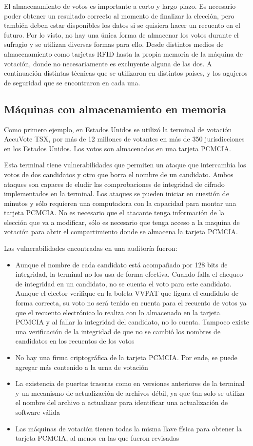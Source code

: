 El almacenamiento de votos es importante a corto y largo plazo. Es necesario poder obtener un resultado correcto al momento de finalizar la elección, pero también deben estar disponibles los datos si se quisiera hacer un recuento en el futuro.
Por lo visto, no hay una única forma de almacenar los votos durante el sufragio y se utilizan diversas formas para ello. Desde distintos medios de almacenamiento como tarjetas RFID hasta la propia memoria de la máquina de votación, donde no necesariamente es excluyente alguna de las dos.
A continuación distintas técnicas que se utilizaron en distintos países, y los agujeros de seguridad que se encontraron en cada una.

\subsection{Máquinas con almacenamiento en memoria}

Como primero ejemplo, en Estados Unidos se utilizó la terminal de votación AccuVote TSX, por más de 12 millones de votantes en más de 350 jurisdicciones en los Estados Unidos. Los votos son almacenados en una tarjeta PCMCIA\cite{davtyan}.

Esta terminal tiene vulnerabilidades que permiten un ataque que intercambia los votos de dos candidatos y otro que borra el nombre de un candidato. Ambos ataques son capaces de eludir las comprobaciones de integridad de cifrado implementados en la terminal. Los ataques se pueden iniciar en cuestión de minutos y sólo requieren una computadora con la capacidad para montar una tarjeta PCMCIA. No es necesario que el atacante tenga información de la elección que va a modificar, sólo es necesario que tenga acceso a la maquina de votación para abrir el compartimiento donde se almacena la tarjeta PCMCIA.

Las vulnerabilidades encontradas en una auditoría fueron:
\begin{itemize}
	\item Aunque el nombre de cada candidato está acompañado por 128 bits de integridad, la terminal no los usa de forma efectiva. Cuando falla el chequeo de integridad en un candidato, no se cuenta el voto para este candidato. Aunque el elector verifique en la boleta VVPAT que figura el candidato de forma correcta, su voto no será tenido en cuenta para el recuento de votos ya que el recuento electrónico lo realiza con lo almacenado en la tarjeta PCMCIA y al fallar la integridad del candidato, no lo cuenta. Tampoco existe una verificación de la integridad de que no se cambió los nombres de candidatos en los recuentos de los votos
	\item No hay una firma criptográfica de la tarjeta PCMCIA. Por ende, se puede agregar más contenido a la urna de votación
	\item La existencia de puertas traseras como en versiones anteriores de la terminal y un mecanismo de actualización de archivos débil, ya que tan solo se utiliza el nombre del archivo a actualizar para identificar una actualización de software válida
	\item Las máquinas de votación tienen todas la misma llave física para obtener la tarjeta PCMCIA, al menos en las que fueron revisadas
\end{itemize}

